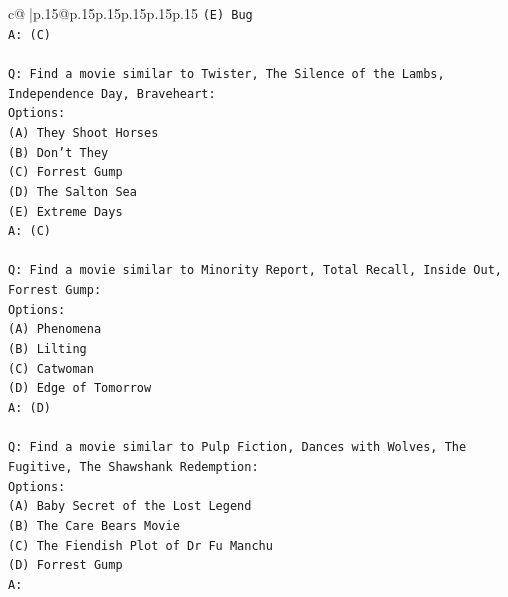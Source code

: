 \documentclass{article}
\begin{document}
{\begin{supertabular}{c@{$\;$}|p{.15\linewidth}@{}p{.15\linewidth}p{.15\linewidth}p{.15\linewidth}p{.15\linewidth}p{.15\linewidth}}
{{{\texttt{(E) Bug} \\
\texttt{A: (C)} \\
\\ 
\texttt{Q: Find a movie similar to Twister, The Silence of the Lambs, Independence Day, Braveheart:} \\
\texttt{Options:} \\
\texttt{(A) They Shoot Horses} \\
\texttt{(B) Don't They} \\
\texttt{(C) Forrest Gump} \\
\texttt{(D) The Salton Sea} \\
\texttt{(E) Extreme Days} \\
\texttt{A: (C)} \\
\\ 
\texttt{Q: Find a movie similar to Minority Report, Total Recall, Inside Out, Forrest Gump:} \\
\texttt{Options:} \\
\texttt{(A) Phenomena} \\
\texttt{(B) Lilting} \\
\texttt{(C) Catwoman} \\
\texttt{(D) Edge of Tomorrow} \\
\texttt{A: (D)} \\
\\ 
\texttt{Q: Find a movie similar to Pulp Fiction, Dances with Wolves, The Fugitive, The Shawshank Redemption:} \\
\texttt{Options:} \\
\texttt{(A) Baby Secret of the Lost Legend} \\
\texttt{(B) The Care Bears Movie} \\
\texttt{(C) The Fiendish Plot of Dr Fu Manchu} \\
\texttt{(D) Forrest Gump} \\
\texttt{A:} \\
            }
        }
    }
     \\ \\


\end{supertabular}}
\end{document}
